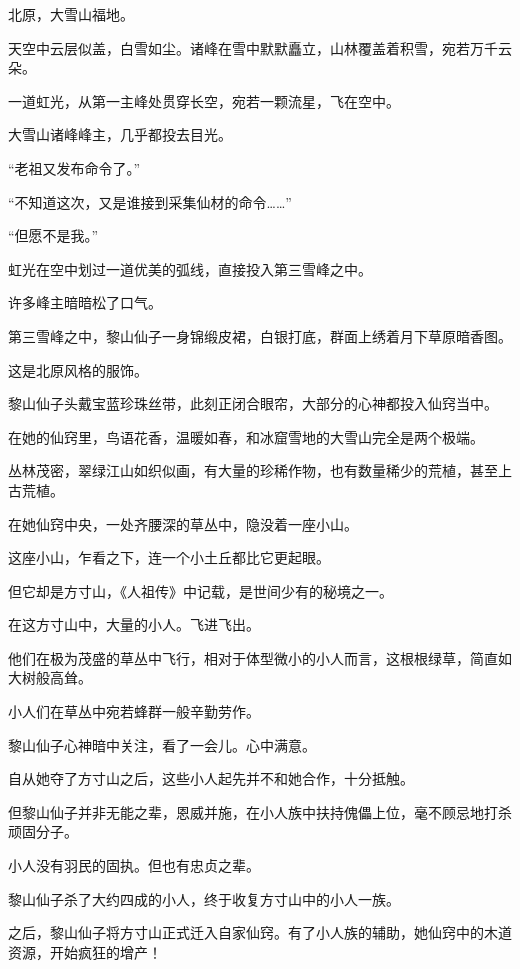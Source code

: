 
\begin{this_body}



北原，大雪山福地。

天空中云层似盖，白雪如尘。诸峰在雪中默默矗立，山林覆盖着积雪，宛若万千云朵。

一道虹光，从第一主峰处贯穿长空，宛若一颗流星，飞在空中。

大雪山诸峰峰主，几乎都投去目光。

“老祖又发布命令了。”

“不知道这次，又是谁接到采集仙材的命令……”

“但愿不是我。”

虹光在空中划过一道优美的弧线，直接投入第三雪峰之中。

许多峰主暗暗松了口气。

第三雪峰之中，黎山仙子一身锦缎皮裙，白银打底，群面上绣着月下草原暗香图。

这是北原风格的服饰。

黎山仙子头戴宝蓝珍珠丝带，此刻正闭合眼帘，大部分的心神都投入仙窍当中。

在她的仙窍里，鸟语花香，温暖如春，和冰窟雪地的大雪山完全是两个极端。

丛林茂密，翠绿江山如织似画，有大量的珍稀作物，也有数量稀少的荒植，甚至上古荒植。

在她仙窍中央，一处齐腰深的草丛中，隐没着一座小山。

这座小山，乍看之下，连一个小土丘都比它更起眼。

但它却是方寸山，《人祖传》中记载，是世间少有的秘境之一。

在这方寸山中，大量的小人。飞进飞出。

他们在极为茂盛的草丛中飞行，相对于体型微小的小人而言，这根根绿草，简直如大树般高耸。

小人们在草丛中宛若蜂群一般辛勤劳作。

黎山仙子心神暗中关注，看了一会儿。心中满意。

自从她夺了方寸山之后，这些小人起先并不和她合作，十分抵触。

但黎山仙子并非无能之辈，恩威并施，在小人族中扶持傀儡上位，毫不顾忌地打杀顽固分子。

小人没有羽民的固执。但也有忠贞之辈。

黎山仙子杀了大约四成的小人，终于收复方寸山中的小人一族。

之后，黎山仙子将方寸山正式迁入自家仙窍。有了小人族的辅助，她仙窍中的木道资源，开始疯狂的增产！


\end{this_body}
